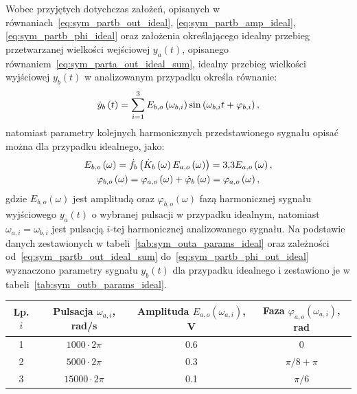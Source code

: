 Wobec przyjętych dotychczas założeń, opisanych w równaniach~\eqref{eq:sym_partb_out_ideal}, \eqref{eq:sym_partb_amp_ideal}, \eqref{eq:sym_partb_phi_ideal} oraz założenia określającego idealny przebieg przetwarzanej wielkości wejściowej $y_{a}(t)$, opisanego równaniem~\eqref{eq:sym_parta_out_ideal_sum}, idealny przebieg wielkości wyjściowej $y_{b}(t)$ w analizowanym przypadku określa równanie:
\begin{equation}
\dot{y}_{b} \left(t\right) = \sum _{i=1} ^{3} E_{b,o} \left(\omega_{b,i}\right) \sin \left(\omega_{b,i} t + \varphi_{b,i}\right) \label{eq:sym_partb_out_ideal_sum},
\end{equation}
natomiast parametry kolejnych harmonicznych przedstawionego sygnału opisać można dla przypadku idealnego, jako:
\begin{gather}
E_{b,o} \left(\omega\right) = \dot{f}_{b} \left(\dot{K}_{b} \left(\omega\right) E_{a,o} \left(\omega\right)\right) = \num{3.3} E_{a,o} \left(\omega\right) \label{eq:sym_partb_amp_out_ideal}, \\
\varphi_{b,o} \left(\omega\right) = \varphi_{a,o} \left(\omega\right) + \dot{\varphi}_{b} \left(\omega\right) = \varphi_{a,o} \left(\omega\right) \label{eq:sym_partb_phi_out_ideal},
\end{gather}
gdzie $E_{b,o}(\omega)$ jest amplitudą oraz $\varphi_{b,o}(\omega)$ fazą harmonicznej sygnału wyjściowego $y_{a}(t)$ o wybranej pulsacji w przypadku idealnym, natomiast $\omega_{a,i} = \omega_{b,i}$ jest pulsacją $i$-tej harmonicznej analizowanego sygnału. Na podstawie danych zestawionych w tabeli~\ref{tab:sym_outa_params_ideal} oraz zależności od~\eqref{eq:sym_partb_out_ideal_sum} do~\eqref{eq:sym_partb_phi_out_ideal} wyznaczono parametry sygnału $y_{b}(t)$ dla przypadku idealnego i zestawiono je w tabeli~\ref{tab:sym_outb_params_ideal}.

\begin{table}[htb!]
\begin{center}
\begin{tabular}[c]{| c | c | c | c |} \hline
\textbf{Lp. $i$} & \textbf{Pulsacja $\omega_{a,i}$, rad/s} & \textbf{Amplituda $E_{a,o}(\omega_{a,i})$, V} & \textbf{Faza $\varphi_{a,o}(\omega_{a,i})$, rad} \\ \hline
1 & $1000  \cdot 2\pi$ &  \num{0.6} & $0$           \\ \hline
2 & $5000  \cdot 2\pi$ &  \num{0.3} & $\pi/8 + \pi$ \\ \hline
3 & $15000 \cdot 2\pi$ &  \num{0.1} & $\pi/6$       \\ \hline
\end{tabular}
\end{center}
\end{table}

